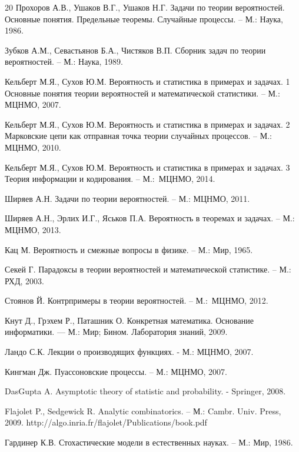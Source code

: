 \begin{thebibliography} {20}
Прохоров А.В., Ушаков В.Г., Ушаков Н.Г. Задачи по теории вероятностей. Основные понятия. Предельные теоремы. Случайные процессы. – М.: Наука, 1986. 

Зубков А.М., Севастьянов Б.А., Чистяков В.П. Сборник задач по теории вероятностей. – М.: Наука, 1989. 

Кельберт М.Я., Сухов Ю.М. Вероятность и статистика в примерах и задачах. 1 Основные понятия теории вероятностей и математической статистики. – М.: МЦНМО, 2007.

Кельберт М.Я., Сухов Ю.М. Вероятность и статистика в примерах и задачах. 2 Марковские цепи как отправная точка теории случайных процессов. – М.: МЦНМО, 2010.

Кельберт М.Я., Сухов Ю.М. Вероятность и статистика в примерах и задачах. 3 Теория информации и кодирования. – \mbox{М.: МЦНМО}, 2014.



Ширяев А.Н. Задачи по теории вероятностей. – М.: МЦНМО, 2011. 

Ширяев А.Н., Эрлих И.Г., Яськов П.А. Вероятность в теоремах и задачах. – М.: МЦНМО, 2013. 

Кац М. Вероятность и смежные вопросы в физике. – М.: Мир, 1965.

\label{sekei}  
Секей Г. Парадоксы в теории вероятностей и математической статистике. – М.: РХД, 2003.

\label{stoianov} 
Стоянов Й. Контрпримеры в теории вероятностей. – \mbox{М.: МЦНМО}, 2012.


Кнут Д., Грэхем Р., Паташник О. Конкретная математика. Основание информатики.  — М.: Мир; Бином. Лаборатория знаний, 2009.

Ландо С.К. Лекции о производящих функциях. - М.: МЦНМО, 2007.

Кингман Дж. Пуассоновские процессы. -- М.: МЦНМО, 2007.

\label{Gupta}
DasGupta A. Asymptotic theory of statistic and probability. - Springer, 2008.

Flajolet P., Sedgewick R. Analytic combinatorics. – М.: Cambr. Univ. Press, 2009.
{\small http://algo.inria.fr/flajolet/Publications/book.pdf}

Гардинер К.В. Стохастические модели в естественных науках. -- М.: Мир, 1986.


\end{thebibliography}
